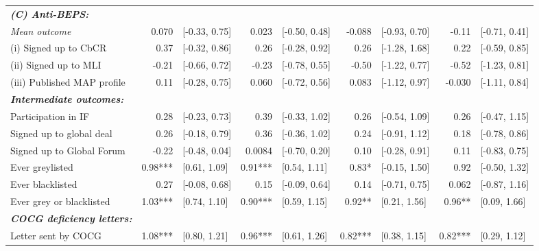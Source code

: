 \begin{adjustbox}{max width=\textwidth}
\begin{tabular}{l*{4}{r@{\hspace{3pt}}l}}
\midrule \emph{{\bf (C) Anti-BEPS: }}&&&&&&&&\\
\hspace{.3cm} \emph{Mean outcome}& 0.070 & [-0.33, 0.75] & 0.023 & [-0.50, 0.48] & -0.088 & [-0.93, 0.70] & -0.11 & [-0.71, 0.41] \\
\hspace{.4cm} (i) Signed up to CbCR& 0.37 & [-0.32, 0.86] & 0.26 & [-0.28, 0.92] & 0.26 & [-1.28, 1.68] & 0.22 & [-0.59, 0.85] \\
\hspace{.4cm} (ii) Signed up to MLI& -0.21 & [-0.66, 0.72] & -0.23 & [-0.78, 0.55] & -0.50 & [-1.22, 0.77] & -0.52 & [-1.23, 0.81] \\
\hspace{.4cm} (iii) Published MAP profile& 0.11 & [-0.28, 0.75] & 0.060 & [-0.72, 0.56] & 0.083 & [-1.12, 0.97] & -0.030 & [-1.11, 0.84] \\
\midrule \emph{{\bf Intermediate outcomes: }}&&&&&&&&\\
\hspace{.4cm}  Participation in IF& 0.28 & [-0.23, 0.73] & 0.39 & [-0.33, 1.02] & 0.26 & [-0.54, 1.09] & 0.26 & [-0.47, 1.15] \\
\hspace{.4cm}  Signed up to global deal& 0.26 & [-0.18, 0.79] & 0.36 & [-0.36, 1.02] & 0.24 & [-0.91, 1.12] & 0.18 & [-0.78, 0.86] \\
\hspace{.4cm} Signed up to Global Forum& -0.22 & [-0.48, 0.04] & 0.0084 & [-0.70, 0.20] & 0.10 & [-0.28, 0.91] & 0.11 & [-0.83, 0.75] \\
\hspace{.4cm} Ever greylisted& 0.98*** & [0.61, 1.09] & 0.91*** & [0.54, 1.11] & 0.83* & [-0.15, 1.50] & 0.92 & [-0.50, 1.32] \\
\hspace{.4cm} Ever blacklisted& 0.27 & [-0.08, 0.68] & 0.15 & [-0.09, 0.64] & 0.14 & [-0.71, 0.75] & 0.062 & [-0.87, 1.16] \\
\hspace{.4cm} Ever grey or blacklisted& 1.03*** & [0.74, 1.10] & 0.90*** & [0.59, 1.15] & 0.92** & [0.21, 1.56] & 0.96** & [0.09, 1.66] \\
\midrule \emph{{\bf COCG deficiency letters: }}&&&&&&&&\\
\hspace{.4cm} Letter sent by COCG& 1.08*** & [0.80, 1.21] & 0.96*** & [0.61, 1.26] & 0.82*** & [0.38, 1.15] & 0.82*** & [0.29, 1.12] \\

\end{tabular}
\end{adjustbox}
